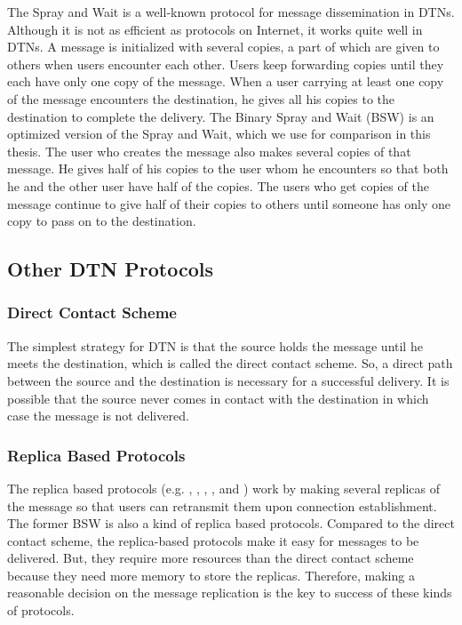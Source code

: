 \noindent The Spray and Wait \cite{C31} is a well-known protocol for message dissemination in DTNs. Although it is not as efficient as protocols on Internet, it works quite well in DTNs. A message is initialized with several copies, a part of which are given to others when users encounter each other. Users keep forwarding copies until they each have only one copy of the message. When a user carrying at least one copy of the message encounters the destination, he gives all his copies to the destination to complete the delivery. The Binary Spray and Wait (BSW) \cite{C31} is an optimized version of the Spray and Wait, which we use for comparison in this thesis. The user who creates the message also makes several copies of that message. He gives half of his copies to the user whom he encounters so that both he and the other user have half of the copies. The users who get copies of the message continue to give half of their copies to others until someone has only one copy to pass on to the destination.

\subsection{ Other DTN Protocols}


\subsubsection{ Direct Contact Scheme}

\noindent The simplest strategy for DTN is that the source holds the message until he meets the destination, which is called the direct contact scheme. So, a direct path between the source and the destination is necessary for a successful delivery. It is possible that the source never comes in contact with the destination in which case the message is not delivered. 


\subsubsection{ Replica Based Protocols}

\noindent The replica based protocols (e.g. \cite{C6}, \cite{C7}, \cite{C8}, \cite{C9}, and \cite{C37}) work by making several replicas of the message so that users can retransmit them upon connection establishment. The former BSW is also a kind of replica based protocols. Compared to the direct contact scheme, the replica-based protocols make it easy for messages to be delivered. But, they require more resources than the direct contact scheme because they need more memory to store the replicas. Therefore, making a reasonable decision on the message replication is the key to success of these kinds of protocols.


